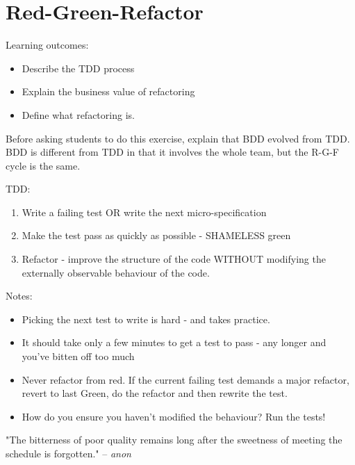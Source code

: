 \chapter*{Red-Green-Refactor}

\ifnotes

    Learning outcomes:
    
    \begin{itemize}
        \item Describe the TDD process
        \item Explain the business value of refactoring
        \item Define what refactoring is.
    \end{itemize}
    
    Before asking students to do this exercise, explain that BDD evolved from TDD. BDD is different from TDD in that it involves the whole team, but the R-G-F cycle is the same.
    
    TDD:
    \begin{enumerate}
        \item Write a failing test OR write the next micro-specification
        \item Make the test pass as quickly as possible - SHAMELESS green
        \item Refactor - improve the structure of the code WITHOUT modifying the externally observable behaviour of the code.
    \end{enumerate}
    
    Notes:
    \begin{itemize}
        \item Picking the next test to write is hard - and takes practice.
        \item It should take only a few minutes to get a test to pass - any longer and you've bitten off too much
        \item Never refactor from red. If the current failing test demands a major refactor, revert to last Green, do the refactor and then rewrite the test.
        \item How do you ensure you haven't modified the behaviour? Run the tests!
    \end{itemize}
    
\fi

\ifcontent

    \begin{framed}
       "The bitterness of poor quality remains long after the sweetness of meeting the schedule is forgotten." -- \textit{anon}
    \end{framed}    
    
